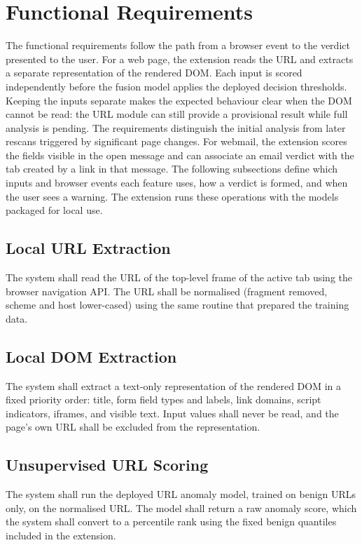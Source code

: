 \documentclass{FastFyp}
\begin{document}
\section{Functional Requirements}
The functional requirements follow the path from a browser event to the verdict presented to the user. For a web page, the extension reads the URL and extracts a separate representation of the rendered DOM. Each input is scored independently before the fusion model applies the deployed decision thresholds. Keeping the inputs separate makes the expected behaviour clear when the DOM cannot be read: the URL module can still provide a provisional result while full analysis is pending. The requirements distinguish the initial analysis from later rescans triggered by significant page changes. For webmail, the extension scores the fields visible in the open message and can associate an email verdict with the tab created by a link in that message. The following subsections define which inputs and browser events each feature uses, how a verdict is formed, and when the user sees a warning. The extension runs these operations with the models packaged for local use.

\subsection{Local URL Extraction}
The system shall read the URL of the top-level frame of the active tab using the browser navigation API. The URL shall be normalised (fragment removed, scheme and host lower-cased) using the same routine that prepared the training data.

\subsection{Local DOM Extraction}
The system shall extract a text-only representation of the rendered DOM in a fixed priority order: title, form field types and labels, link domains, script indicators, iframes, and visible text. Input values shall never be read, and the page's own URL shall be excluded from the representation.

\subsection{Unsupervised URL Scoring}
The system shall run the deployed URL anomaly model, trained on benign URLs only, on the normalised URL. The model shall return a raw anomaly score, which the system shall convert to a percentile rank using the fixed benign quantiles included in the extension.
\end{document}
